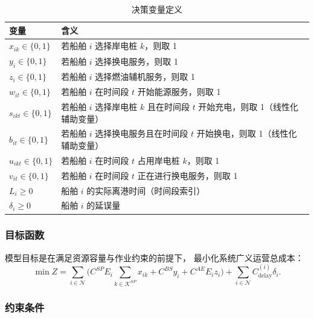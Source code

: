 \documentclass[UTF8, a4paper, 12pt]{ctexart}
\theoremstyle{plain}
\theoremstyle{definition}
\theoremstyle{remark}
\begin{document}
\begin{table}[!htbp]
\centering
\caption{决策变量定义}
\begin{tabularx}{\textwidth}{>{\raggedright\arraybackslash}p{} X}
\toprule
变量 & 含义 \\
\midrule
$x_{ik} \in \{0,1\}$ & 若船舶 $i$ 选择岸电桩 $k$，则取 1 \\
$y_i \in \{0,1\}$ & 若船舶 $i$ 选择换电服务，则取 1 \\
$z_i \in \{0,1\}$ & 若船舶 $i$ 选择燃油辅机服务，则取 1 \\
$w_{it} \in \{0,1\}$ & 若船舶 $i$ 在时间段 $t$ 开始能源服务，则取 1 \\
$s_{ikt} \in \{0,1\}$ & 若船舶 $i$ 选择岸电桩 $k$ 且在时间段 $t$ 开始充电，则取 1（线性化辅助变量） \\
$b_{it} \in \{0,1\}$ & 若船舶 $i$ 选择换电服务且在时间段 $t$ 开始换电，则取 1（线性化辅助变量） \\
$u_{ikt} \in \{0,1\}$ & 若船舶 $i$ 在时间段 $t$ 占用岸电桩 $k$，则取 1 \\
$v_{it} \in \{0,1\}$ & 若船舶 $i$ 在时间段 $t$ 正在进行换电服务，则取 1 \\
$L_i \ge 0$ & 船舶 $i$ 的实际离港时间（时间段索引） \\
$\delta_i \ge 0$ & 船舶 $i$ 的延误量 \\
\bottomrule
\end{tabularx}
\end{table}


\subsubsection{目标函数}

模型目标是在满足资源容量与作业约束的前提下，
最小化系统广义运营总成本：
\begin{equation}
\min Z =
\sum_{i \in \mathcal{N}}
\Big(
C^{SP} E_i \sum_{k \in \mathcal{K}^{SP}} x_{ik}
+ C^{BS} y_i
+ C^{AE} E_i z_i
\Big)
+ \sum_{i \in \mathcal{N}} C^{(i)}_{\text{delay}} \delta_i .
\label{eq:obj_24_final}
\end{equation}

\subsubsection{约束条件}
\end{document}
